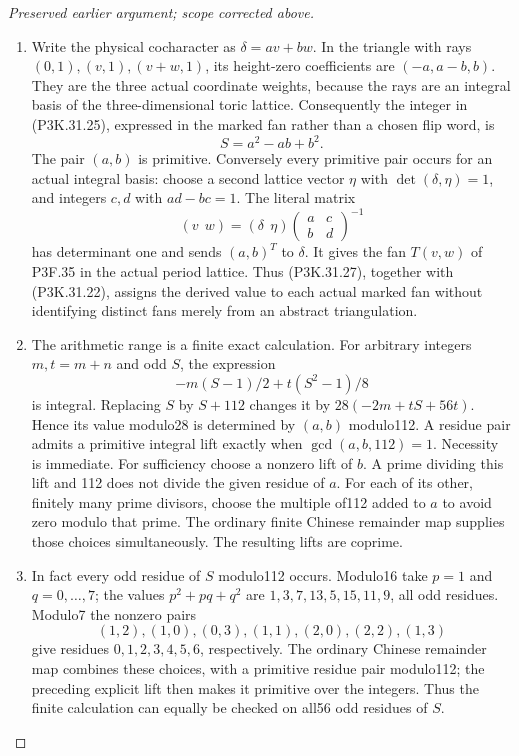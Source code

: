 \begin{proof}[Preserved earlier argument; scope corrected above]
\begin{enumerate}[label=\arabic*.]
\item Write the physical cocharacter as
\(\delta=a v+b w\). In the triangle with rays
\((0,1),(v,1),(v+w,1)\), its height-zero coefficients
are \((-a,a-b,b)\). They are the three actual
coordinate weights, because the rays are an integral
basis of the three-dimensional toric lattice.
Consequently the integer in (P3K.31.25), expressed in the
marked fan rather than a chosen flip word, is
\[
                         S=a^2-ab+b^2.
                                                        \tag{P3K.31.27}
\]
The pair \((a,b)\) is primitive. Conversely every
primitive pair occurs for an actual integral basis:
choose a second lattice vector \(\eta\) with
\(\det(\delta,\eta)=1\), and integers \(c,d\) with
\(ad-bc=1\). The literal matrix
\[
       (v\ \ w)=(\delta\ \ \eta)
                        \begin{pmatrix}a&c\\b&d\end{pmatrix}^{-1}
\]
has determinant one and sends \((a,b)^T\) to \(\delta\).
It gives the fan \(T(v,w)\) of P3F.35 in the actual
period lattice.
Thus (P3K.31.27), together with (P3K.31.22), assigns the
derived value to each actual marked fan
without identifying distinct fans merely from an
abstract triangulation.

\item The arithmetic range is a finite exact calculation.
For arbitrary integers \(m,t=m+n\) and odd \(S\),
the expression
\[
                  -m(S-1)/2+t(S^2-1)/8
\]
is integral. Replacing \(S\) by \(S+112\) changes it
by \(28(-2m+tS+56t)\). Hence its value modulo28 is
determined by \((a,b)\) modulo112.
A residue pair admits a primitive integral lift
exactly when \(\gcd(a,b,112)=1\). Necessity is
immediate. For sufficiency choose a nonzero lift
of \(b\). A prime dividing this lift and 112 does
not divide the given residue of \(a\). For each
of its other, finitely many prime divisors, choose
the multiple of112 added to \(a\) to avoid zero
modulo that prime. The ordinary finite Chinese
remainder map supplies those choices simultaneously.
The resulting lifts are coprime.

\item In fact every odd residue of \(S\) modulo112 occurs.
Modulo16 take \(p=1\) and \(q=0,\ldots,7\); the
values \(p^2+pq+q^2\) are
\(1,3,7,13,5,15,11,9\), all odd residues.
Modulo7 the nonzero pairs
\[
 (1,2),(1,0),(0,3),(1,1),(2,0),(2,2),(1,3)
\]
give residues \(0,1,2,3,4,5,6\), respectively.
The ordinary Chinese remainder map combines these
choices, with a primitive residue pair modulo112;
the preceding explicit lift then makes it primitive
over the integers. Thus the finite calculation can
equally be checked on all56 odd residues of \(S\).


\end{enumerate}
\end{proof}
